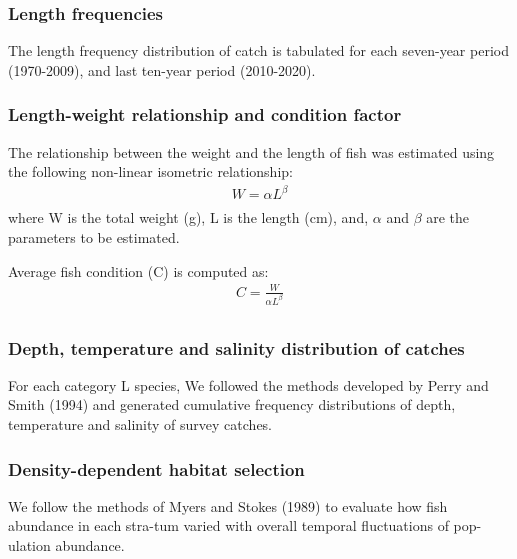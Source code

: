 \documentclass[12pt]{article}\usepackage[]{graphicx}\usepackage[]{color}
\begin{document}
\subsubsection{Length frequencies}\label{length-frequencies}

The length frequency distribution of catch is tabulated for each seven-year period (1970-2009), and last ten-year period (2010-2020).

\subsubsection{Length-weight relationship and condition factor}\label{length-weight-relationship-and-condition-factor}

The relationship between the weight and the length of fish was estimated using the following non-linear isometric relationship:
\begin{eqnarray*}\label{eqLengthWeight}
W = \alpha L ^\beta  
\\
\end{eqnarray*}
where W is the total weight (g), L is the length (cm), and, \(\alpha\) and \(\beta\) are the parameters to be estimated.

Average fish condition (C) is computed as:
\begin{eqnarray*}\label{eqCondition}
C = \frac{W}{\alpha L ^\beta}  
\\
\end{eqnarray*}
\subsubsection{Depth, temperature and salinity distribution of catches}\label{depth-temperature-and-salinity-distribution-of-catches}

For each category L species, We followed the methods developed by Perry and Smith (1994) and generated cumulative frequency distributions of depth, temperature and salinity of survey catches.

\subsubsection{Density-dependent habitat selection}\label{density-dependent-habitat-selection}

We follow the methods of Myers and Stokes (1989) to evaluate how fish abundance in each stra-tum varied with overall temporal fluctuations of pop-ulation abundance.
\end{document}
